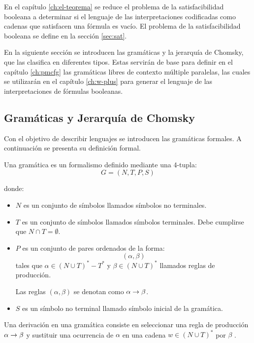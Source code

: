 En el capítulo \ref{ch:el-teorema} se reduce el problema de la satisfacibilidad booleana a determinar si el lenguaje de las interpretaciones codificadas como cadenas que satisfacen una fórmula es vacío. El problema de la satisfacibilidad booleana se define en la sección \ref{sec:sat}.

En la siguiente sección se introducen las gramáticas y la jerarquía de Chomsky, que las clasifica en diferentes tipos. Estas servirán de base para definir en el capítulo \ref{ch:pmcfg} las gramáticas libres de contexto múltiple paralelas, las cuales se utilizarán en el capítulo \ref{ch:w-plus} para generar el lenguaje de las interpretaciones de fórmulas booleanas.

\subsection{Gramáticas y Jerarquía de Chomsky}
\label{sec:grammars}

Con el objetivo de describir lenguajes se introducen las gramáticas formales. A continuación se presenta su definición formal.

\begin{definition}
	Una gramática es un formalismo definido mediante una 4-tupla:
	$$
		G = (N, T, P, S)
	$$

	donde:
	\begin{itemize}
		\item $N$ es un conjunto de símbolos llamados símbolos no terminales.
		\item $T$ es un conjunto de símbolos llamados símbolos terminales. Debe cumplirse que $N \cap T = \emptyset$.
		\item $P$ es un conjunto de pares ordenados de la forma:
		      $$
			      (\alpha, \beta)
		      $$
		      tales que $\alpha \in (N \cup T)^* - T^*$ y $\beta \in (N \cup T)^*$ llamados reglas de producción.

		      Las reglas $(\alpha, \beta)$ se denotan como $\alpha \rightarrow \beta$.
		\item $S$ es un símbolo no terminal llamado símbolo inicial de la gramática.

	\end{itemize}
\end{definition}

Una derivación en una gramática consiste en seleccionar una regla de producción $\alpha \rightarrow \beta$ y sustituir una ocurrencia de $\alpha$ en una cadena $w \in (N \cup T)^*$ por $\beta$ \cite{automataTheory}.

